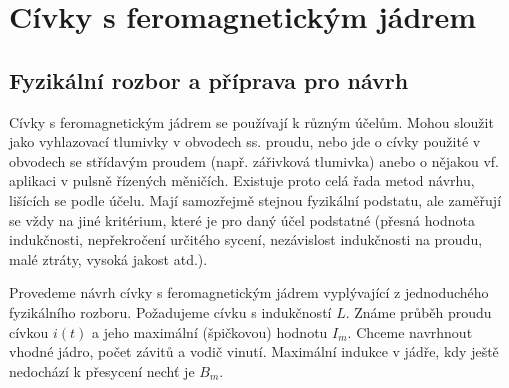   \section{Cívky s feromagnetickým jádrem}
    \subsection{Fyzikální rozbor a příprava pro návrh}\label{ES:ssec_01}
      Cívky s feromagnetickým jádrem se používají k různým účelům. Mohou sloužit jako vyhlazovací
      tlumivky v obvodech ss. proudu, nebo jde o cívky použité v obvodech se střídavým proudem 
      (např. zářivková tlumivka) anebo o nějakou vf. aplikaci v pulsně řízených měničích. Existuje 
      proto celá řada metod návrhu, lišících se podle účelu. Mají samozřejmě stejnou fyzikální 
      podstatu, ale zaměřují se vždy na jiné kritérium, které je pro daný účel podstatné (přesná 
      hodnota indukčnosti, nepřekročení určitého sycení, nezávislost indukčnosti na proudu, malé 
      ztráty, vysoká jakost atd.).
      
      Provedeme návrh cívky s feromagnetickým jádrem vyplývající z jednoduchého fyzikálního rozboru.
      Požadujeme cívku s indukčností \(L\). Známe průběh proudu cívkou \(i(t)\) a jeho maximální 
      (špičkovou) hodnotu \(I_m\). Chceme navrhnout vhodné jádro, počet závitů a vodič vinutí. 
      Maximální indukce v jádře, kdy ještě nedochází k přesycení nechť je \(B_m\).
      
